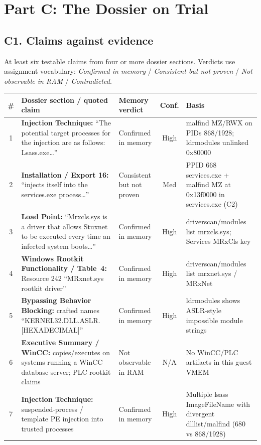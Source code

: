 \documentclass[11pt,letterpaper]{article}
\begin{document}
\section*{Part C: The Dossier on Trial}
\subsection*{C1. Claims against evidence}
At least six testable claims from four or more dossier sections. Verdicts use assignment vocabulary:
\textit{Confirmed in memory} / \textit{Consistent but not proven} / \textit{Not observable in RAM} / \textit{Contradicted}.

{\footnotesize
\begin{tabularx}{\textwidth}{@{}c >{\RaggedRight\arraybackslash}p{1.7in} >{\RaggedRight\arraybackslash}p{1.15in} c >{\RaggedRight\arraybackslash}Y@{}}
\toprule
\# & Dossier section / quoted claim & Memory verdict & Conf. & Basis \\
 & \textbf{Injection Technique:} ``The potential target processes for the injection are as follows: Lsass.exe\ldots'' & Confirmed in memory & High & malfind MZ/RWX on PIDs 868/1928; ldrmodules unlinked 0x80000 \\
2 & \textbf{Installation / Export 16:} ``injects itself into the services.exe process\ldots'' & Consistent but not proven & Med & PPID 668 services.exe + malfind MZ at 0x13f0000 in services.exe (C2) \\
3 & \textbf{Load Point:} ``Mrxcls.sys is a driver that allows Stuxnet to be executed every time an infected system boots\ldots'' & Confirmed in memory & High & driverscan/modules list mrxcls.sys; Services MRxCls key \\
4 & \textbf{Windows Rootkit Functionality / Table~4:} Resource 242 ``MRxnet.sys rootkit driver'' & Confirmed in memory & High & driverscan/modules list mrxnet.sys / MRxNet \\
5 & \textbf{Bypassing Behavior Blocking:} crafted names ``KERNEL32.DLL.ASLR.[HEXADECIMAL]'' & Confirmed in memory & High & ldrmodules shows ASLR-style impossible module strings \\
6 & \textbf{Executive Summary / WinCC:} copies/executes on systems running a WinCC database server; PLC rootkit claims & Not observable in RAM & N/A & No WinCC/PLC artifacts in this guest VMEM \\
7 & \textbf{Injection Technique:} suspended-process / template PE injection into trusted processes & Confirmed in memory & High & Multiple lsass ImageFileName with divergent dlllist/malfind (680 vs 868/1928) \\
\bottomrule
\end{tabularx}}
\end{document}
